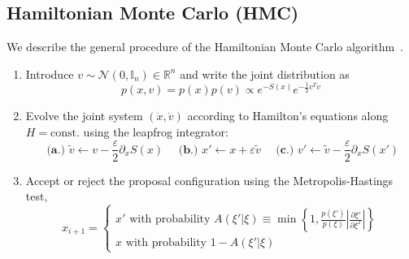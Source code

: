 \documentclass[a4paper,11pt]{article}
\begin{document}
\subsection{\label{subsec:hmc}Hamiltonian Monte Carlo (HMC)}
We describe the general procedure of the Hamiltonian Monte Carlo
algorithm~\cite{Betancourt:2017}.
\begin{enumerate}
    \item Introduce \(v \sim \mathcal{N} (0,\mathbb{I}_{n}) \in \mathbb{R}^{n}\)
        and write the joint distribution as
        \begin{equation}
            p(x, v) = p(x) p(v) \propto e^{-S(x)} e^{-\frac{1}{2} v^{T} v}
        \end{equation}
    \item Evolve the joint system \((\dot x, \dot v)\) according to
        Hamilton's equations along \(H=\text{const.}\) using the leapfrog
        integrator:
        \begin{equation}
            \textbf{ (a.)  } \tilde{v} \leftarrow v - \frac{\varepsilon}{2}\partial_{x}S(x)\quad
            \textbf{ (b.)  } x' \leftarrow x + \varepsilon \tilde{v}\quad
            \textbf{ (c.)  } v' \leftarrow \tilde{v} - \frac{\varepsilon}{2}\partial_{x} S(x')
        \end{equation}
    \item Accept or reject the proposal configuration using the
        Metropolis-Hastings test,
        \begin{equation}
            x_{i+1} = \begin{cases}
                x' \text{ with probability } 
                    A(\xi'|\xi) \equiv \min\left\{1, \frac{p(\xi')}{p(\xi)}%
                    \left|\frac{\partial\xi'}{\partial\xi^{T}}\right|\right\}\\
                x \text{ with probability } 1 - A(\xi'|\xi)
            \end{cases}
        \end{equation}
\end{enumerate}
\end{document}
